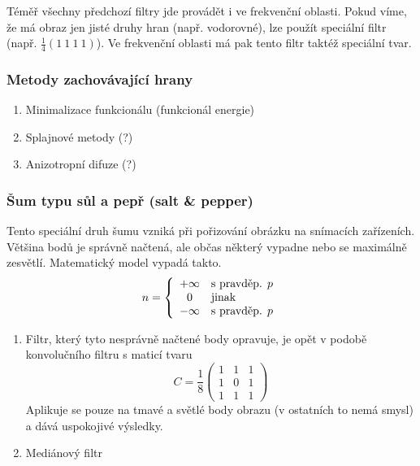 Téměř všechny předchozí filtry jde provádět i ve frekvenční oblasti. Pokud víme, že má obraz jen jisté druhy
hran (např. vodorovné), lze použít speciální filtr (např. $\frac{1}{4}(1\ 1\ 1\ 1)$). Ve frekvenční oblasti
má pak tento filtr taktéž speciální tvar.

\subsubsection{Metody zachovávající hrany}
\begin{enumerate}
	\item Minimalizace funkcionálu (funkcionál energie)
	\item Splajnové metody (?)
	\item Anizotropní difuze (?)
\end{enumerate}

\subsubsection{Šum typu sůl a pepř (salt \& pepper)}

Tento speciální druh šumu vzniká při pořizování obrázku na snímacích zařízeních. Většina bodů je správně načtená, ale 
občas některý vypadne nebo se maximálně zesvětlí. Matematický model vypadá takto.
\begin{equation}
n=\left\{\begin{array}{cl}+\infty&\hbox{s pravděp. $p$}\\
0&\hbox{jinak}\\-\infty&\hbox{s pravděp. $p$}
\end{array}\right.
\end{equation}

\begin{enumerate}
	\item Filtr, který tyto nesprávně načtené body opravuje, je opět v podobě konvolučního filtru s maticí tvaru
\begin{equation}
C = \frac{1}{8}\left(\begin{array}{ccc}1&1&1\\1&0&1\\1&1&1\end{array}\right)
\end{equation}
Aplikuje se pouze na tmavé a světlé body obrazu (v ostatních to nemá smysl) a dává uspokojivé výsledky.

	\item Mediánový filtr

\end{enumerate}

